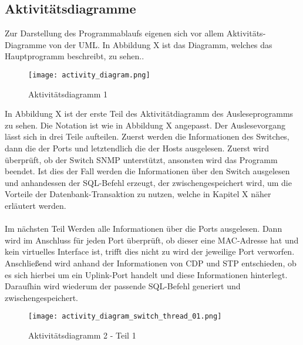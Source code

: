 \subsection{Aktivitätsdiagramme}
\label{subsec:acitvitydiagrams}

Zur Darstellung des Programmablaufs eigenen sich vor allem Aktivitäts-Diagramme von der UML. In Abbildung X ist das Diagramm, welches das Hauptprogramm beschreibt, zu sehen..\\

\begin{figure}[H]
\centering
\texttt{[image: activity\_diagram.png]}
\caption{Aktivitätsdiagramm 1}
\label{fig:activitydiagram1}
\end{figure}

In Abbildung X ist der erste Teil des Aktivitätdiagramm des Ausleseprogramms zu sehen.
Die Notation ist wie in Abbildung X angepasst.
Der Auslesevorgang lässt sich in drei Teile aufteilen. Zuerst werden die Informationen des Switches, dann die der Ports und letztendlich die der Hosts ausgelesen.
Zuerst wird überprüft, ob der Switch SNMP unterstützt, ansonsten wird das Programm beendet.
Ist dies der Fall werden die Informationen über den Switch ausgelesen und anhandessen der SQL-Befehl erzeugt, der zwischengespeichert wird, um die Vorteile der Datenbank-Transaktion zu nutzen, welche in Kapitel X näher erläutert werden.\\\\
Im nächsten Teil Werden alle Informationen über die Ports ausgelesen.
Dann wird im Anschluss für jeden Port überprüft, ob dieser eine MAC-Adresse hat und kein virtuelles Interface ist, trifft dies nicht zu wird der jeweilige Port verworfen.
Anschließend wird anhand der Informationen von CDP und STP entschieden, ob es sich hierbei um ein Uplink-Port handelt und diese Informationen hinterlegt. Daraufhin wird wiederum der passende SQL-Befehl generiert und zwischengespeichert.

\begin{figure}[H]
\centering
\texttt{[image: activity\_diagram\_switch\_thread\_01.png]}
\caption{Aktivitätsdiagramm 2 - Teil 1}
\label{fig:activitydiagram21}
\end{figure}


